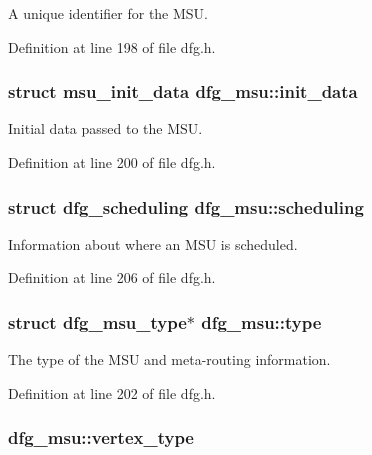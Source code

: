 A unique identifier for the M\-S\-U. 



Definition at line 198 of file dfg.\-h.

\hypertarget{structdfg__msu_ae1af580efcec56f0840d058069f5a208}{
\subsubsection[{init\-\_\-data}]{\setlength{\rightskip}{0pt plus 5cm}struct {\bf msu\-\_\-init\-\_\-data} dfg\-\_\-msu\-::init\-\_\-data}}\label{structdfg__msu_ae1af580efcec56f0840d058069f5a208}


Initial data passed to the M\-S\-U. 



Definition at line 200 of file dfg.\-h.

\hypertarget{structdfg__msu_a4ca8d344a0d4c4cf72b8a045eb3d3d61}{
\subsubsection[{scheduling}]{\setlength{\rightskip}{0pt plus 5cm}struct {\bf dfg\-\_\-scheduling} dfg\-\_\-msu\-::scheduling}}\label{structdfg__msu_a4ca8d344a0d4c4cf72b8a045eb3d3d61}


Information about where an M\-S\-U is scheduled. 



Definition at line 206 of file dfg.\-h.

\hypertarget{structdfg__msu_aecd16205ea67b3a51ad5df742ddc2778}{
\subsubsection[{type}]{\setlength{\rightskip}{0pt plus 5cm}struct {\bf dfg\-\_\-msu\-\_\-type}$\ast$ dfg\-\_\-msu\-::type}}\label{structdfg__msu_aecd16205ea67b3a51ad5df742ddc2778}


The type of the M\-S\-U and meta-\/routing information. 



Definition at line 202 of file dfg.\-h.

\hypertarget{structdfg__msu_a2b64c45188762a61c6ab906f7f1fccdd}{
\subsubsection[{vertex\-\_\-type}]{ dfg\-\_\-msu\-::vertex\-\_\-type}}\label{structdfg__msu_a2b64c45188762a61c6ab906f7f1fccdd}


